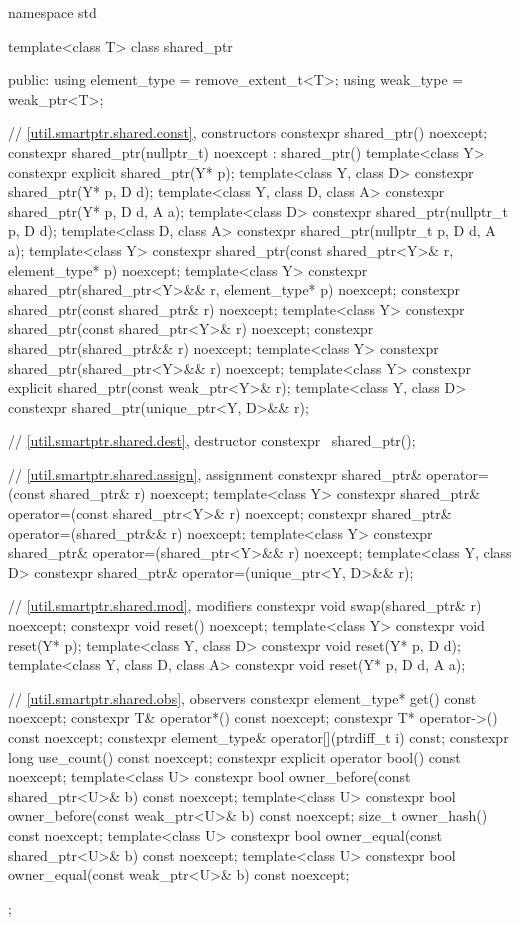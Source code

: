 \begin{codeblock}
namespace std {
  template<class T> class shared_ptr {
  public:
    using element_type = remove_extent_t<T>;
    using weak_type    = weak_ptr<T>;

    // \ref{util.smartptr.shared.const}, constructors
    constexpr shared_ptr() noexcept;
    constexpr shared_ptr(nullptr_t) noexcept : shared_ptr() { }
    template<class Y>
      constexpr explicit shared_ptr(Y* p);
    template<class Y, class D>
      constexpr shared_ptr(Y* p, D d);
    template<class Y, class D, class A>
      constexpr shared_ptr(Y* p, D d, A a);
    template<class D>
      constexpr shared_ptr(nullptr_t p, D d);
    template<class D, class A>
      constexpr shared_ptr(nullptr_t p, D d, A a);
    template<class Y>
      constexpr shared_ptr(const shared_ptr<Y>& r, element_type* p) noexcept;
    template<class Y>
      constexpr shared_ptr(shared_ptr<Y>&& r, element_type* p) noexcept;
    constexpr shared_ptr(const shared_ptr& r) noexcept;
    template<class Y>
      constexpr shared_ptr(const shared_ptr<Y>& r) noexcept;
    constexpr shared_ptr(shared_ptr&& r) noexcept;
    template<class Y>
      constexpr shared_ptr(shared_ptr<Y>&& r) noexcept;
    template<class Y>
      constexpr explicit shared_ptr(const weak_ptr<Y>& r);
    template<class Y, class D>
      constexpr shared_ptr(unique_ptr<Y, D>&& r);

    // \ref{util.smartptr.shared.dest}, destructor
    constexpr ~shared_ptr();

    // \ref{util.smartptr.shared.assign}, assignment
    constexpr shared_ptr& operator=(const shared_ptr& r) noexcept;
    template<class Y>
      constexpr shared_ptr& operator=(const shared_ptr<Y>& r) noexcept;
    constexpr shared_ptr& operator=(shared_ptr&& r) noexcept;
    template<class Y>
      constexpr shared_ptr& operator=(shared_ptr<Y>&& r) noexcept;
    template<class Y, class D>
      constexpr shared_ptr& operator=(unique_ptr<Y, D>&& r);

    // \ref{util.smartptr.shared.mod}, modifiers
    constexpr void swap(shared_ptr& r) noexcept;
    constexpr void reset() noexcept;
    template<class Y>
      constexpr void reset(Y* p);
    template<class Y, class D>
      constexpr void reset(Y* p, D d);
    template<class Y, class D, class A>
      constexpr void reset(Y* p, D d, A a);

    // \ref{util.smartptr.shared.obs}, observers
    constexpr element_type* get() const noexcept;
    constexpr T& operator*() const noexcept;
    constexpr T* operator->() const noexcept;
    constexpr element_type& operator[](ptrdiff_t i) const;
    constexpr long use_count() const noexcept;
    constexpr explicit operator bool() const noexcept;
    template<class U>
      constexpr bool owner_before(const shared_ptr<U>& b) const noexcept;
    template<class U>
      constexpr bool owner_before(const weak_ptr<U>& b) const noexcept;
    size_t owner_hash() const noexcept;
    template<class U>
      constexpr bool owner_equal(const shared_ptr<U>& b) const noexcept;
    template<class U>
      constexpr bool owner_equal(const weak_ptr<U>& b) const noexcept;
  };

}
\end{codeblock}
